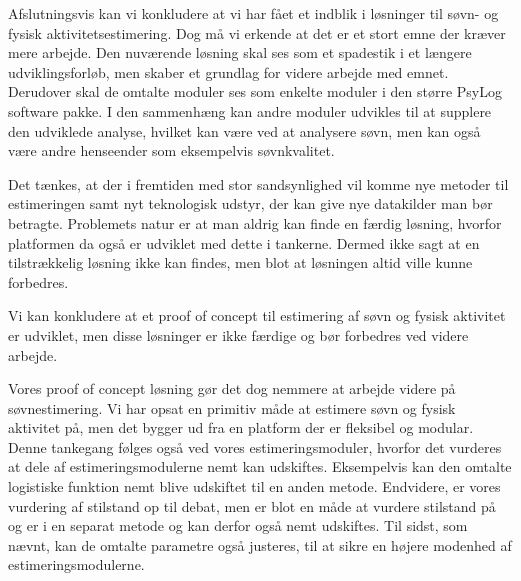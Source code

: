 Afslutningsvis kan vi konkludere at vi har fået et indblik i løsninger til søvn- og fysisk aktivitetsestimering.
Dog må vi erkende at det er et stort emne der kræver mere arbejde.
Den nuværende løsning skal ses som et spadestik i et længere udviklingsforløb, men skaber et grundlag for videre arbejde med emnet.
Derudover skal de omtalte moduler ses som enkelte moduler i den større PsyLog software pakke.
I den sammenhæng kan andre moduler udvikles til at supplere den udviklede analyse, hvilket kan være ved at analysere søvn, men kan også være andre henseender som eksempelvis søvnkvalitet.

Det tænkes, at der i fremtiden med stor sandsynlighed vil komme nye metoder til estimeringen samt nyt teknologisk udstyr, der kan give nye datakilder man bør betragte.
Problemets natur er at man aldrig kan finde en færdig løsning, hvorfor platformen da også er udviklet med dette i tankerne.
Dermed ikke sagt at en tilstrækkelig løsning ikke kan findes, men blot at løsningen altid ville kunne forbedres.

Vi kan konkludere at et proof of concept til estimering af søvn og fysisk aktivitet er udviklet, men disse løsninger er ikke færdige og bør forbedres ved videre arbejde.

Vores proof of concept løsning gør det dog nemmere at arbejde videre på søvnestimering.
Vi har opsat en primitiv måde at estimere søvn og fysisk aktivitet på, men det bygger ud fra en platform der er fleksibel og modular.
Denne tankegang følges også ved vores estimeringsmoduler, hvorfor det vurderes at dele af estimeringsmodulerne nemt kan udskiftes.
Eksempelvis kan den omtalte logistiske funktion nemt blive udskiftet til en anden metode.
Endvidere, er vores vurdering af stilstand op til debat, men er blot en måde at vurdere stilstand på og er i en separat metode og kan derfor også nemt udskiftes. 
Til sidst, som nævnt, kan de omtalte parametre også justeres, til at sikre en højere modenhed af estimeringsmodulerne.



